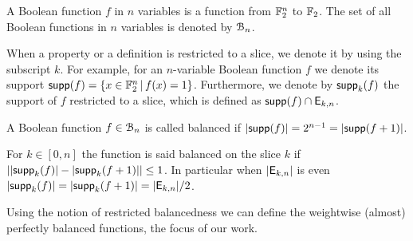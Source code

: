 \documentclass[11pt]{llncs}
\begin{document}
\begin{definition}\label{def:bool_f}
	A Boolean function $f$ in $n$ variables is a function from $\mathbb{F}_2^n$ to $\mathbb{F}_2$. 
	The set of all Boolean functions in $n$ variables is denoted by $\mathcal{B}_n$.%
\end{definition}


When a property or a definition is restricted to a slice, we denote it by using the subscript $k$. 
For example, for an $n$-variable Boolean function $f$ we denote its support $\mathsf{supp}(f)=\{x\in \mathbb{F}_2^n \, | \, f(x)=1  \}$. 
Furthermore, we denote by $\mathsf{supp}_{k}(f)$ the support of $f$ restricted to a slice, which is defined as $\mathsf{supp}(f)\cap \mathsf{E}_{k,n}$.


\begin{definition}[Balancedness]\label{def:balancedness}
	A Boolean function $f\in \mathcal{B}_n$ is called balanced if $|\mathsf{supp}(f)|=2^{n-1}=|\mathsf{supp}(f+1)|$. 
	
	For $k\in [0,n]$ the function is said balanced on the slice $k$ if $||\mathsf{supp}_{k}(f)|-|\mathsf{supp}_{k}(f+1)| |\le 1$. In particular when $|\mathsf{E}_{k,n}|$ is even $|\mathsf{supp}_{k}(f)|=|\mathsf{supp}_{k}(f+1)|=|\mathsf{E}_{k,n}|/2$.
\end{definition}


Using the notion of restricted balancedness we can define the weightwise (almost) perfectly balanced functions, the focus of our work.
\end{document}
